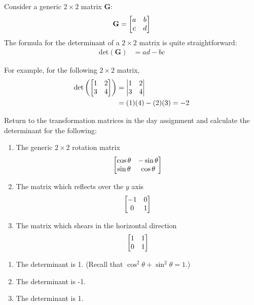 Consider a generic $2\times 2$ matrix $\mathbf{G}$:
\[ \mathbf{G} = \begin{bmatrix} a & b \\ c & d\end{bmatrix} \]
The formula for the determinant of a $2\times 2$ matrix is quite straightforward:
\begin{align}
\mbox{det}(\mathbf{G}) &= ad - bc
\end{align}


For example, for the following $2\times 2$ matrix,
\begin{align}
\mbox{det}\left(\begin{bmatrix} 1 & 2 \\ 3 & 4\end{bmatrix}\right) &= \begin{vmatrix} 1 & 2\\ 3 & 4 \end{vmatrix} \nonumber \\
&=  (1)(4)-(2)(3) =  -2
\end{align}

\begin{prob}\label{ex:det}
Return to the transformation matrices in the day assignment and calculate the determinant for the following:
\begin{enumerate}
    \item The generic $2\times 2$ rotation matrix
    \[ \begin{bmatrix} \cos \theta & -\sin \theta \\ \sin \theta & \cos \theta\end{bmatrix} \]
    \item The matrix which reflects over the $y$ axis
    \[ \begin{bmatrix} -1 & 0 \\ 0 & 1\end{bmatrix} \]
    \item The matrix which shears in the horizontal direction
    \[ \begin{bmatrix} 1 & 1 \\ 0 & 1\end{bmatrix} \]
\end{enumerate}
\end{prob}
\begin{sol}
\begin{enumerate}
        \item The determinant is 1. (Recall that $\cos^2\theta + \sin^2\theta = 1$.)
        \item The determinant is -1.
        \item The determinant is 1.
    \end{enumerate}
\end{sol}

